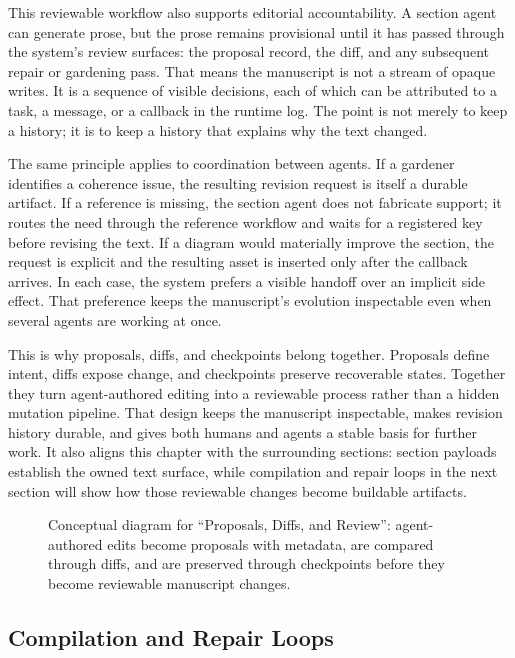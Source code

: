 \documentclass[11pt]{article}
\begin{document}
This reviewable workflow also supports editorial accountability. A section agent can generate prose, but the prose remains provisional until it has passed through the system's review surfaces: the proposal record, the diff, and any subsequent repair or gardening pass. That means the manuscript is not a stream of opaque writes. It is a sequence of visible decisions, each of which can be attributed to a task, a message, or a callback in the runtime log. The point is not merely to keep a history; it is to keep a history that explains why the text changed.

The same principle applies to coordination between agents. If a gardener identifies a coherence issue, the resulting revision request is itself a durable artifact. If a reference is missing, the section agent does not fabricate support; it routes the need through the reference workflow and waits for a registered key before revising the text. If a diagram would materially improve the section, the request is explicit and the resulting asset is inserted only after the callback arrives. In each case, the system prefers a visible handoff over an implicit side effect. That preference keeps the manuscript's evolution inspectable even when several agents are working at once.

This is why proposals, diffs, and checkpoints belong together. Proposals define intent, diffs expose change, and checkpoints preserve recoverable states. Together they turn agent-authored editing into a reviewable process rather than a hidden mutation pipeline. That design keeps the manuscript inspectable, makes revision history durable, and gives both humans and agents a stable basis for further work. It also aligns this chapter with the surrounding sections: section payloads establish the owned text surface, while compilation and repair loops in the next section will show how those reviewable changes become buildable artifacts.

\begin{figure}[htbp]
\centering

\caption{Conceptual diagram for ``Proposals, Diffs, and Review'': agent-authored edits become proposals with metadata, are compared through diffs, and are preserved through checkpoints before they become reviewable manuscript changes.}
\end{figure}



\subsection{Compilation and Repair Loops}
\end{document}
